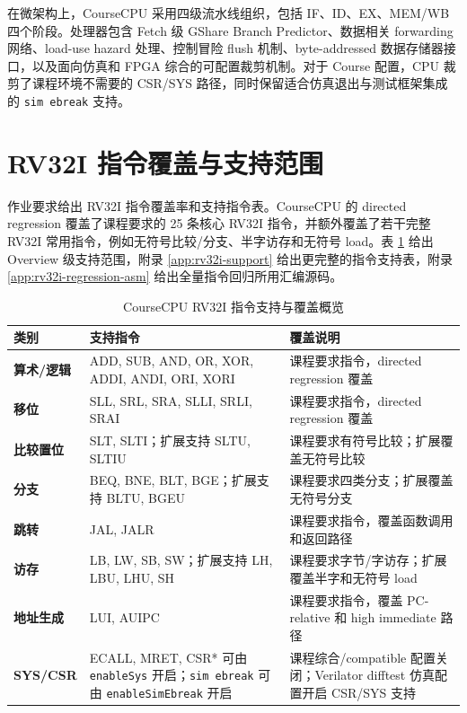 \documentclass[UTF8,a4paper,12pt]{ctexrep}
\begin{document}
在微架构上，CourseCPU 采用四级流水线组织，包括 IF、ID、EX、MEM/WB 四个阶段。处理器包含 Fetch 级 GShare Branch Predictor、数据相关 forwarding 网络、load-use hazard 处理、控制冒险 flush 机制、byte-addressed 数据存储器接口，以及面向仿真和 FPGA 综合的可配置裁剪机制。对于 Course 配置，CPU 裁剪了课程环境不需要的 CSR/SYS 路径，同时保留适合仿真退出与测试框架集成的 \texttt{sim ebreak} 支持。

\section{RV32I 指令覆盖与支持范围}

作业要求给出 RV32I 指令覆盖率和支持指令表。CourseCPU 的 directed regression 覆盖了课程要求的 25 条核心 RV32I 指令，并额外覆盖了若干完整 RV32I 常用指令，例如无符号比较/分支、半字访存和无符号 load。表 \ref{tab:overview-isa-support} 给出 Overview 级支持范围，附录 \ref{app:rv32i-support} 给出更完整的指令支持表，附录 \ref{app:rv32i-regression-asm} 给出全量指令回归所用汇编源码。

\begin{table}[H]
  \centering
  \caption{CourseCPU RV32I 指令支持与覆盖概览}
  \label{tab:overview-isa-support}
  \begin{tabularx}{\textwidth}{>{\bfseries}lXX}
    \toprule
    类别 & 支持指令 & 覆盖说明 \\
    \midrule
    算术/逻辑 & ADD, SUB, AND, OR, XOR, ADDI, ANDI, ORI, XORI & 课程要求指令，directed regression 覆盖 \\
    移位 & SLL, SRL, SRA, SLLI, SRLI, SRAI & 课程要求指令，directed regression 覆盖 \\
    比较置位 & SLT, SLTI；扩展支持 SLTU, SLTIU & 课程要求有符号比较；扩展覆盖无符号比较 \\
    分支 & BEQ, BNE, BLT, BGE；扩展支持 BLTU, BGEU & 课程要求四类分支；扩展覆盖无符号分支 \\
    跳转 & JAL, JALR & 课程要求指令，覆盖函数调用和返回路径 \\
    访存 & LB, LW, SB, SW；扩展支持 LH, LBU, LHU, SH & 课程要求字节/字访存；扩展覆盖半字和无符号 load \\
    地址生成 & LUI, AUIPC & 课程要求指令，覆盖 PC-relative 和 high immediate 路径 \\
    SYS/CSR & ECALL, MRET, CSR* 可由 \texttt{enableSys} 开启；\texttt{sim ebreak} 可由 \texttt{enableSimEbreak} 开启 & 课程综合/compatible 配置关闭；Verilator difftest 仿真配置开启 CSR/SYS 支持 \\
    \bottomrule
  \end{tabularx}
\end{table}
\end{document}
